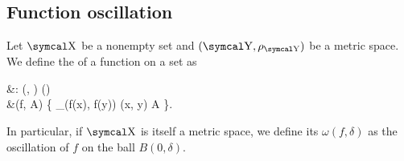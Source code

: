 \subsection{Function oscillation}\label{subsec:function_oscillation}

\begin{definition}\label{def:function_oscillation}
  Let \( \CX \) be a nonempty set and \( (\CY, \rho_{\CY}) \) be a metric space. We define the  of a function on a set as
  \begin{BreakableAlign*}
     &\omega: \Func(\CX, \CY) \times \Pow(\CX) \to [0, \infty] \\
     &\omega(f, A) \coloneqq \sup \Big\{ \rho_{\CY}(f(x), f(y)) \colon (x, y) \in A \Big\}.
  \end{BreakableAlign*}

  In particular, if \( \CX \) is itself a metric space, we define its  \( \omega(f, \delta) \) as the oscillation of \( f \) on the ball \( B(0, \delta) \).
\end{definition}


